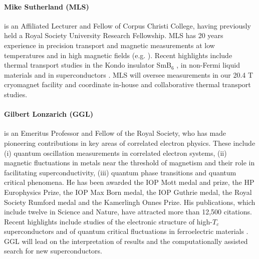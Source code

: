 

\paragraph{Mike Sutherland (MLS)}
is an Affiliated Lecturer and Fellow of Corpus Christi College, having previously held a
Royal Society University Research Fellowship. MLS has 20 years experience in precision transport and
magnetic measurements at low temperatures and in high magnetic fields (e.g. ). Recent %
highlights include thermal transport studies in the Kondo insulator SmB$_6$ , in non-Fermi liquid materials  and in superconductors . MLS will oversee measurements in our 20.4 T cryomagnet facility and coordinate in-house and collaborative thermal transport studies.

\paragraph{Gilbert Lonzarich (GGL)}
is an Emeritus Professor and Fellow of the Royal Society, who has
made pioneering contributions in key areas of correlated electron
physics. These include (i) quantum oscillation measurements
in correlated electron systems, (ii) magnetic fluctuations in metals near the threshold of magnetism and their role in facilitating superconductivity, (iii) quantum phase transitions and quantum critical phenomena. 
He has been awarded the IOP Mott
medal and prize, the HP Europhysics Prize, the IOP Max Born medal, the
IOP Guthrie medal, the Royal Society Rumford medal and the Kamerlingh Onnes Prize. His publications, which include twelve in
Science and Nature, have
attracted more than 12,500 citations. Recent highlights
include studies of %
the electronic structure
of high-$T_c$ superconductors
 and %
of quantum critical fluctuations in
ferroelectric materials . GGL will lead on the interpretation of results and the computationally assisted search for new superconductors.

